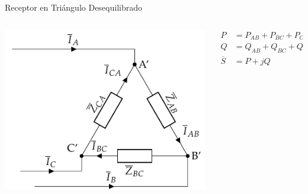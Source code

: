 \documentclass[aspectratio=169, usenames,svgnames,dvipsnames]{beamer}
\begin{document}
\begin{frame}[label={sec:org54935a5}]{Receptor en Triángulo Desequilibrado}
\begin{columns}
\begin{column}{0.6\columnwidth}
\begin{center}
\includegraphics[width=.9\linewidth]{../figs/TrianguloDesequilibrado_Receptor.pdf}
\end{center}
\end{column}

\begin{column}{0.4\columnwidth}
\begin{align*}
  P &= P_{AB} + P_{BC} + P_{CA}\\
  Q &= Q_{AB} + Q_{BC} + Q_{CA}\\
  \overline{S} &= P + jQ
\end{align*}
\end{column}
\end{columns}
\end{frame}
\end{document}
